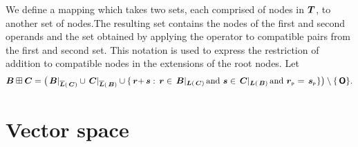 \begin{definition}[Notation]
  We define a mapping which takes two sets, each comprised of nodes in
  $\DOM$, to another set of nodes.The resulting set contains the nodes
  of the first and second operands and the set obtained by applying
  the operator to compatible pairs from the first and second set. This
  notation is used to express the restriction of addition to
  compatible nodes in the extensions of the root nodes.  Let
  \begin{align*}
      \set{B}\stplus\set{C} = \extnO{B}{C}{r}{s}{+}.
  \end{align*}
\end{definition}



\section{Vector space}

